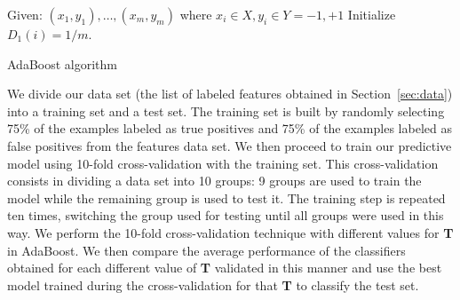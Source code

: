 \begin{algorithm}
\begin{algorithmic}
\STATE Given: $(x_1,y_1),\dots,(x_m,y_m)$ where $x_i \in X, y_i \in Y = {-1,+1}$
\STATE Initialize $D_1(i) = 1/m$.
  \ENDFOR
{}
\end{algorithmic}
\label{alg:adaboost}
\caption{AdaBoost algorithm \citep{freund1999short}}
\end{algorithm}

We divide our data set (the list of labeled features obtained in
Section~\ref{sec:data}) into a training set and a test set. The training set is
built by randomly selecting 75\% of the examples labeled as true positives and
75\% of the examples labeled as false positives from the features data set. We
then proceed to train our predictive model using 10-fold cross-validation
with the training set. This cross-validation consists in dividing a data set
into 10 groups: 9 groups are used to train the model while the remaining group is
used to test it. The training step is repeated ten times, switching the group
used for testing until all groups were used in this way.  We perform the
10-fold cross-validation technique with different values for \textbf{T} in
AdaBoost. We then compare the average performance of the classifiers obtained for
each different value of \textbf{T} validated in this manner and use the best
model trained during the cross-validation for that \textbf{T} to classify the
test set.


